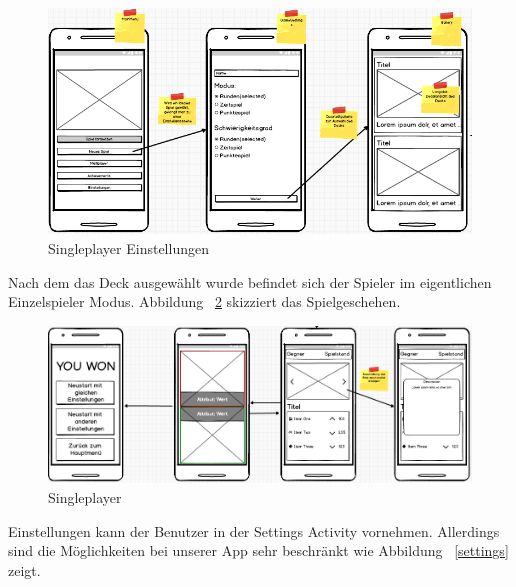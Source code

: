 \documentclass{scrartcl}
\begin{document}
\begin{figure}[h]
	\includegraphics[scale=0.7]{img/mockup_game_process_1.png}
	\caption{Singleplayer Einstellungen}
	\label{singleplayer1}
\end{figure}

Nach dem das Deck ausgewählt wurde befindet sich der Spieler im eigentlichen Einzelspieler Modus. Abbildung ~\ref{singleplayer2} skizziert das Spielgeschehen.

\begin{figure}[h]
	\includegraphics[scale=0.55]{img/mockup_game_process_2.png}
	\caption{Singleplayer}
	\label{singleplayer2}
\end{figure}

Einstellungen kann der Benutzer in der Settings Activity vornehmen. Allerdings sind die Möglichkeiten bei unserer App sehr beschränkt wie Abbildung ~\ref{settings} zeigt.
\end{document}
